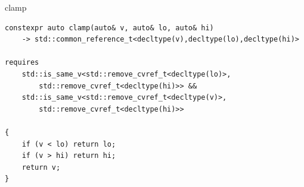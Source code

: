 \documentclass[aspectratio=169]{beamer}
\begin{document}
\begin{frame}[fragile]{clamp}
\begin{small}
\begin{verbatim}
constexpr auto clamp(auto& v, auto& lo, auto& hi) 
    -> std::common_reference_t<decltype(v),decltype(lo),decltype(hi)>

requires
    std::is_same_v<std::remove_cvref_t<decltype(lo)>,
        std::remove_cvref_t<decltype(hi)>> &&
    std::is_same_v<std::remove_cvref_t<decltype(v)>,
        std::remove_cvref_t<decltype(hi)>>

{
    if (v < lo) return lo;
    if (v > hi) return hi;
    return v;
}
\end{verbatim}
\end{small}
\end{frame}
\end{document}
